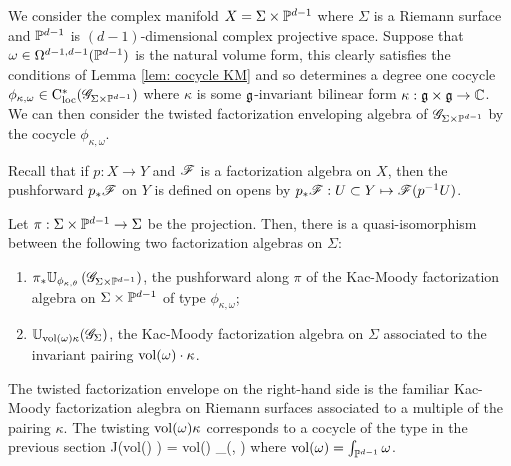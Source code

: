 \documentclass[10pt]{amsart}
\begin{document}
\begin{eg}
We consider the complex manifold $X = \Sigma \times \mathbb P^{d-1}$ where $\Sigma$ is a Riemann surface and $\mathbb P^{d-1}$ is $(d-1)$-dimensional complex projective space.
Suppose that $\omega \in \Omega^{d-1,d-1}(\mathbb P^{d-1})$ is the natural volume form, this clearly satisfies the conditions of Lemma \ref{lem: cocycle KM} and so determines a degree one cocycle $\phi_{\kappa, \omega} \in {\rm C}_{\rm loc}^*(\mathscr G_{\Sigma \times \mathbb P^{d-1}})$ where $\kappa$ is some $\mathfrak g$-invariant bilinear form $\kappa : \mathfrak g \times \mathfrak g \to \mathbb C$. 
We can then consider the twisted factorization enveloping algebra of $\mathscr G_{\Sigma \times \mathbb P^{d-1}}$ by the cocycle $\phi_{\kappa, \omega}$. 

Recall that if $p : X \to Y$ and $\mathscr F$ is a factorization algebra on $X$, then the pushforward $p_* \mathscr F$ on $Y$ is defined on opens by $p_* \mathscr F : U \subset Y \mapsto \mathscr F(p^{-1} U)$. 

\begin{prop}
Let $\pi : \Sigma \times \mathbb P^{d-1} \to \Sigma$ be the projection. 
Then, there is a quasi-isomorphism between the following two factorization algebras on $\Sigma$:
\begin{enumerate}
\item $\pi_* \mathbb U_{\phi_{\kappa, \theta}} \left(\mathscr G_{\Sigma \times \mathbb P^{d-1}}\right)$, the pushforward along $\pi$ of the Kac-Moody factorization algebra on $\Sigma \times \mathbb P^{d-1}$ of type $\phi_{\kappa,\omega}$;
\item $\mathbb U_{{\rm vol}(\omega) \kappa} (\mathscr G_\Sigma)$, the Kac-Moody factorization algebra on $\Sigma$ associated to the invariant pairing ${\rm vol}(\omega) \cdot \kappa$. 
\end{enumerate}
\end{prop}

The twisted factorization envelope on the right-hand side is the familiar Kac-Moody factorization alegbra on Riemann surfaces associated to a multiple of the pairing $\kappa$.
The twisting ${\rm vol}(\omega) \kappa$ corresponds to a cocycle of the type in the previous section 
\ben
J({\rm vol}(\omega) \kappa) = {\rm vol}(\omega) \int_\Sigma \kappa(\alpha, \partial \beta)
\een
where ${\rm vol}(\omega) = \int_{\mathbb P^{d-1}} \omega$. 


\end{eg}
\end{document}
